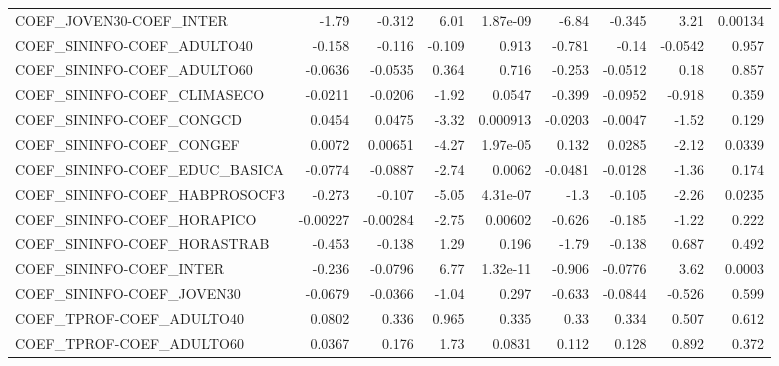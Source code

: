 \begin{tabular}{lrrrrrrrr}
COEF\_JOVEN30-COEF\_INTER           &       -1.79 &       -0.312 &    6.01 & 1.87e-09 &      -6.84 &      -0.345 &         3.21 &       0.00134 \\
COEF\_SININFO-COEF\_ADULTO40        &      -0.158 &       -0.116 &  -0.109 &    0.913 &     -0.781 &       -0.14 &      -0.0542 &         0.957 \\
COEF\_SININFO-COEF\_ADULTO60        &     -0.0636 &      -0.0535 &   0.364 &    0.716 &     -0.253 &     -0.0512 &         0.18 &         0.857 \\
COEF\_SININFO-COEF\_CLIMASECO       &     -0.0211 &      -0.0206 &   -1.92 &   0.0547 &     -0.399 &     -0.0952 &       -0.918 &         0.359 \\
COEF\_SININFO-COEF\_CONGCD          &      0.0454 &       0.0475 &   -3.32 & 0.000913 &    -0.0203 &     -0.0047 &        -1.52 &         0.129 \\
COEF\_SININFO-COEF\_CONGEF          &      0.0072 &      0.00651 &   -4.27 & 1.97e-05 &      0.132 &      0.0285 &        -2.12 &        0.0339 \\
COEF\_SININFO-COEF\_EDUC\_BASICA     &     -0.0774 &      -0.0887 &   -2.74 &   0.0062 &    -0.0481 &     -0.0128 &        -1.36 &         0.174 \\
COEF\_SININFO-COEF\_HABPROSOCF3     &      -0.273 &       -0.107 &   -5.05 & 4.31e-07 &       -1.3 &      -0.105 &        -2.26 &        0.0235 \\
COEF\_SININFO-COEF\_HORAPICO        &    -0.00227 &     -0.00284 &   -2.75 &  0.00602 &     -0.626 &      -0.185 &        -1.22 &         0.222 \\
COEF\_SININFO-COEF\_HORASTRAB       &      -0.453 &       -0.138 &    1.29 &    0.196 &      -1.79 &      -0.138 &        0.687 &         0.492 \\
COEF\_SININFO-COEF\_INTER           &      -0.236 &      -0.0796 &    6.77 & 1.32e-11 &     -0.906 &     -0.0776 &         3.62 &        0.0003 \\
COEF\_SININFO-COEF\_JOVEN30         &     -0.0679 &      -0.0366 &   -1.04 &    0.297 &     -0.633 &     -0.0844 &       -0.526 &         0.599 \\
COEF\_TPROF-COEF\_ADULTO40          &      0.0802 &        0.336 &   0.965 &    0.335 &       0.33 &       0.334 &        0.507 &         0.612 \\
COEF\_TPROF-COEF\_ADULTO60          &      0.0367 &        0.176 &    1.73 &   0.0831 &      0.112 &       0.128 &        0.892 &         0.372 \\

\end{tabular}
